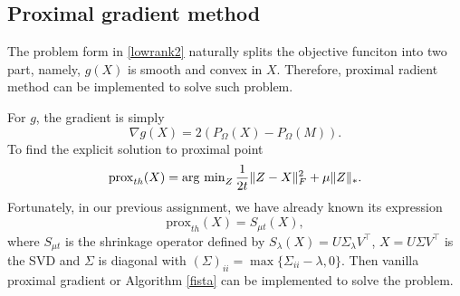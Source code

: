 \documentclass{article}
\newcommand{\prox}{\mathrm{prox}}
\begin{document}
\subsection{Proximal gradient method}
The problem form in \eqref{lowrank2} naturally splits the objective funciton into two part, namely, $g(X)$ is smooth and convex in $X$. Therefore, proximal radient method can be implemented to solve such problem. 

For $g$, the gradient is simply 
\begin{equation}
	\nabla g(X) = 2(P_\Omega(X)-P_\Omega(M)).
\end{equation}
To find the explicit solution to proximal point 
\begin{equation}
	\prox_{th}(X) = \argmin_{Z} \frac{1}{2t}\|Z-X\|_F^2+\mu\|Z\|_*.
\end{equation}
Fortunately, in our previous assignment, we have already known its expression
\begin{equation}
	\prox_{th}(X) = S_{\mu t}(X),
\end{equation}
where $S_{\mu t}$ is the shrinkage operator defined by $S_\lambda(X) = U\Sigma_\lambda V^\top$, $X=U\Sigma V^\top$ is the SVD and $\Sigma$ is diagonal with $(\Sigma)_{ii}=\max\{\Sigma_{ii}-\lambda,0\}$. Then vanilla proximal gradient or Algorithm \ref{fista} can be implemented to solve the problem.
\end{document}
